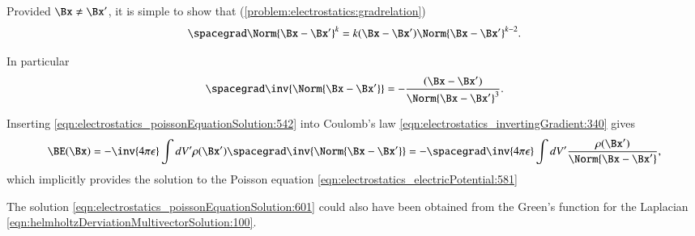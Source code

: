 %
%
Provided \( \Bx \ne \Bx' \), it is simple to show that (\cref{problem:electrostatics:gradrelation})
\begin{dmath}\label{eqn:electrostatics_poissonEquationSolution:541}
\spacegrad \Norm{\Bx - \Bx'}^k = k (\Bx - \Bx') \Norm{ \Bx - \Bx' }^{k-2}.
\end{dmath}

In particular
\begin{dmath}\label{eqn:electrostatics_poissonEquationSolution:542}
\spacegrad \inv{\Norm{\Bx - \Bx'}} = - \frac{(\Bx - \Bx')}{\Norm{ \Bx - \Bx' }^{3}}.
\end{dmath}

Inserting \cref{eqn:electrostatics_poissonEquationSolution:542} into Coulomb's law \cref{eqn:electrostatics_invertingGradient:340} gives
\begin{dmath}\label{eqn:electrostatics_poissonEquationSolution:661}
\BE(\Bx)
=
-\inv{4 \pi \epsilon} \int dV' \rho(\Bx') \spacegrad \inv{\Norm{\Bx - \Bx'}}
=
- \spacegrad \inv{4 \pi \epsilon} \int dV' \frac{\rho(\Bx')}{\Norm{\Bx - \Bx'}},
\end{dmath}
which implicitly provides the solution to the Poisson equation \cref{eqn:electrostatics_electricPotential:581}

The solution \cref{eqn:electrostatics_poissonEquationSolution:601} could also have been obtained from the Green's function for the Laplacian
\cref{eqn:helmholtzDerviationMultivectorSolution:100}.
